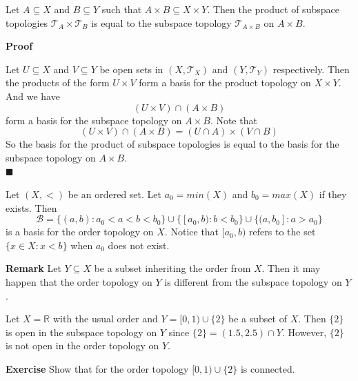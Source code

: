 \documentclass[main.tex]{subfiles}
\begin{document}
\begin{theorem}
    Let $A \subseteq X$ and $B \subseteq Y$ such that $A \times B \subseteq X \times Y$. Then the product of subspace topologies $\mathcal{T}_{A} \times \mathcal{T}_{B}$ is equal to the subspace topology $\mathcal{T}_{A \times B}$ on $A \times B$. 
\end{theorem}
\par \noindent \textbf{Proof} 
\par Let $U \subseteq X$ and $V \subseteq Y$ be open sets in $(X, \mathcal{T}_X)$ and $(Y, \mathcal{T}_Y)$ respectively. Then the products of the form $U \times V$ form a basis for the product topology on $X \times Y$. And we have 
\begin{equation}
    (U \times V) \cap (A \times B) 
\end{equation}
form a basis for the subspace topology on $A \times B$. Note that
\begin{equation}
    (U \times V) \cap (A \times B) = (U \cap A) \times (V \cap B)
\end{equation} 
So the basis for the product of subspace topologies is equal to the basis for the subspace topology on $A \times B$. 
\\ \null \hfill $\blacksquare$ 
\par Let $(X, <)$ be an ordered set. Let $a_0 = min(X)$ and $b_0 = max(X)$ if they exists. Then 
\begin{equation}
    \mathcal{B} = \{ (a, b) : a_0 < a < b < b_0 \} \cup \{ [a_0, b) : b < b_0 \} \cup \{ (a, b_0] : a > a_0 \}
\end{equation}
is a basis for the order topology on $X$. Notice that $[a_0, b)$ refers to the set $\{ x \in X : x < b \}$ when $a_0$ does not exist. 
\par \noindent \textbf{Remark} Let $Y \subseteq X$ be a subset inheriting the order from $X$. Then it may happen that the order topology on $Y$ is different from the subspace topology on $Y$.
\begin{example}
    Let $X = \mathbb{R}$ with the usual order and $Y = [0, 1)\cup \{2\}$ be a subset of $X$. Then $\{2\}$ is open in the subspace topology on $Y$ since \(\{2\} = (1.5, 2.5) \cap Y\). However, $\{2\}$ is not open in the order topology on $Y$. 
\end{example}

\par \noindent \textbf{Exercise} Show that for the order topology $[0,1) \cup \{2\}$ is connected. 
\end{document}
